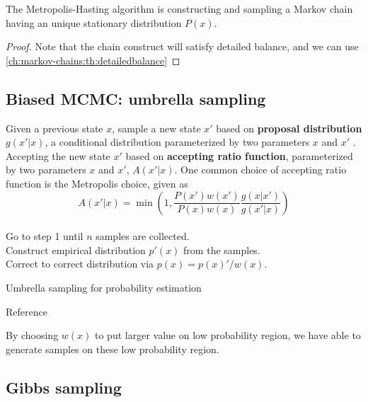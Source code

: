 \begin{refsection}
\begin{theorem}
	The Metropolis-Hasting algorithm is constructing and sampling a Markov chain having an unique stationary distribution $P(x)$.
\end{theorem}
\begin{proof}
	Note that the chain construct will satisfy detailed balance, and we can use \autoref{ch:markov-chains:th:detailedbalance}
\end{proof}


\subsection{Biased MCMC: umbrella sampling}


\begin{algorithm}[H]
	\SetAlgoLined
	Given a previous state $x$, sample a new state $x'$ based on \textbf{proposal distribution} $g(x'|x)$, a conditional distribution parameterized by two parameters $x$ and $x'$ .\\
	Accepting the new state $x'$ based on \textbf{accepting ratio function}, parameterized by two parameters $x$ and $x'$, $A(x'|x)$. One common choice of accepting ratio function is the Metropolis choice, given as
	$$A(x'|x) = \min(1,\frac{P(x')w(x')}{P(x)w(x)}\frac{g(x|x')}{g(x'|x)})$$\\
	Go to step 1 until $n$ samples are collected.\\
	Construct empirical distribution $p'(x)$ from the samples.\\
	Correct to correct distribution via $p(x) = p(x)'/w(x)$.\\ 
	\caption{Umbrella sampling for probability estimation}
\end{algorithm}


\begin{remark}
	Reference \cite{kastner2011umbrella}
\end{remark}

\begin{remark}
	By choosing $w(x)$ to put larger value on low probability region, we have able to generate samples on these low probability region.
\end{remark}



\subsection{Gibbs sampling}


\end{refsection}
